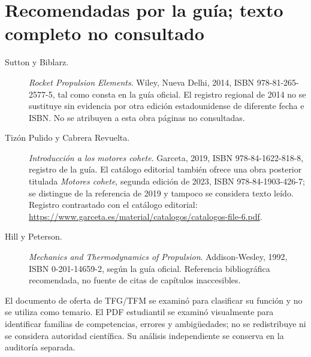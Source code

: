 \section*{Recomendadas por la guía; texto completo no consultado}
\begin{description}
\item[Sutton y Biblarz.] \emph{Rocket Propulsion Elements}. Wiley, Nueva Delhi, 2014, ISBN 978-81-265-2577-5, tal como consta en la guía oficial. El registro regional de 2014 no se sustituye sin evidencia por otra edición estadounidense de diferente fecha e ISBN. No se atribuyen a esta obra páginas no consultadas.
\item[Tizón Pulido y Cabrera Revuelta.] \emph{Introducción a los motores cohete}. Garceta, 2019, ISBN 978-84-1622-818-8, registro de la guía. El catálogo editorial también ofrece una obra posterior titulada \emph{Motores cohete}, segunda edición de 2023, ISBN 978-84-1903-426-7; se distingue de la referencia de 2019 y tampoco se considera texto leído. Registro contrastado con el catálogo editorial: \url{https://www.garceta.es/material/catalogos/catalogos-file-6.pdf}.
\item[Hill y Peterson.] \emph{Mechanics and Thermodynamics of Propulsion}. Addison-Wesley, 1992, ISBN 0-201-14659-2, según la guía oficial. Referencia bibliográfica recomendada, no fuente de citas de capítulos inaccesibles.
\end{description}
El documento de oferta de TFG/TFM se examinó para clasificar su función y no se utiliza como temario. El PDF estudiantil se examinó visualmente para identificar familias de competencias, errores y ambigüedades; no se redistribuye ni se considera autoridad científica. Su análisis independiente se conserva en la auditoría separada.

